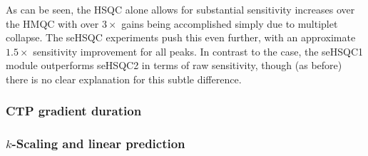 As can be seen, the HSQC alone allows for substantial sensitivity increases over the HMQC with over $3\times$ gains being accomplished simply due to multiplet collapse.
The seHSQC experiments push this even further, with an approximate $1.5\times$ sensitivity improvement for all peaks.
In contrast to the \carbon{} case, the \nitrogen{} seHSQC1 module outperforms seHSQC2 in terms of raw sensitivity, though (as before) there is no clear explanation for this subtle difference.



\subsubsection{CTP gradient duration}



\subsubsection{$k$-Scaling and linear prediction}

